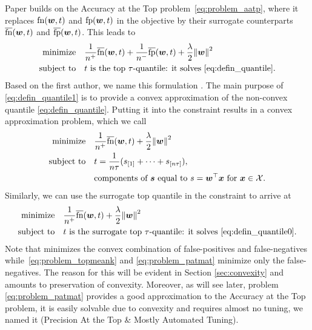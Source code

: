 Paper \cite{grill2016learning} builds on the Accuracy at the Top problem~\eqref{eq:problem_aatp}, where it replaces $\textnormal{fn}(\bm{w}, t)$ and $\textnormal{fp}(\bm{w}, t)$ in the objective by their surrogate counterparts $\overline{\textnormal{fn}}(\bm{w}, t)$ and $\overline{\textnormal{fp}}(\bm{w}, t)$. This leads to
\begin{equation}\label{eq:problem_grill}
  \begin{aligned}
    \minimize
    & \quad \frac{1}{n^{+}}\fns(\bm{w},t) + \frac{1}{n^{-}}\fps(\bm{w},t) + \frac{\lambda}{2}\norm{\bm{w}}^2\\
    \st
    & \quad t\text{ is the top \ensuremath{\tau}-quantile: it solves }\eqref{eq:defin_quantile}.
  \end{aligned}
\end{equation}
Based on the first author, we name this formulation \Grill. The main purpose of \eqref{eq:defin_quantile1} is to provide a convex approximation of the non-convex quantile \eqref{eq:defin_quantile}. Putting it into the constraint results in a convex approximation problem, which we call \TopMeanK
\begin{equation}\label{eq:problem_topmeank}
  \begin{aligned}
    \minimize
    & \quad \frac{1}{n^{+}} \fns(\bm{w},t) + \frac{\lambda}{2}\norm{\bm{w}}^2 \\
    \st
    & \quad t = \frac 1{n\tau}(s_{[1]} + \dots + s_{[n\tau]}), \\
    & \quad \text{components of }\bm{s}\text{ equal to } s = \bm{w}^\top \bm{x} \text{ for } \bm{x} \in \Xc.
  \end{aligned}
\end{equation}
Similarly, we can use the surrogate top quantile in the constraint to arrive at
\begin{equation}\label{eq:problem_patmat}
  \begin{aligned}
    \minimize
    & \quad \frac{1}{n^{+}} \fns(\bm{w},t) + \frac{\lambda}{2}\norm{\bm{w}}^2\\
    \st
    & \quad t \text{ is the surrogate top \ensuremath{\tau}-quantile: it solves }\eqref{eq:defin_quantile0}.
  \end{aligned}
\end{equation}
Note that \Grill minimizes the convex combination of false-positives and false-negatives while~\eqref{eq:problem_topmeank} and \eqref{eq:problem_patmat} minimize only the false-negatives. The reason for this will be evident in Section \ref{sec:convexity} and amounts to preservation of convexity. Moreover, as will see later, problem \eqref{eq:problem_patmat} provides a good approximation to the Accuracy at the Top problem, it is easily solvable due to convexity and requires almost no tuning, we named it \PatMat (Precision At the Top \& Mostly Automated Tuning). 


